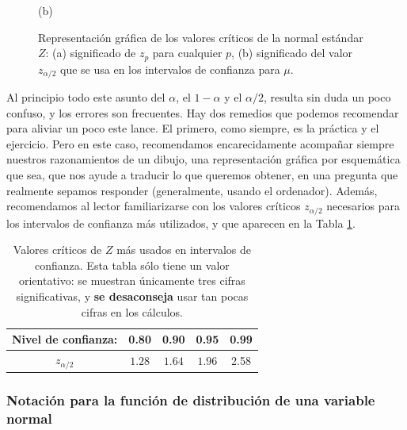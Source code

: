 \begin{figure}[h!]
\begin{center}
\begin{bn}
(b)
\end{bn}
\caption{Representación gráfica de los valores críticos de la normal estándar $Z$:
(a) significado de $z_p$ para cualquier $p$, (b) significado del valor $z_{\alpha/2}$ que se
usa en los intervalos de confianza para $\mu$.}
\label{cap06:fig:ValorCriticoZ}
\end{center}
\end{figure}
%

Al principio todo este asunto del $\alpha$, el $1-\alpha$ y el $\alpha/2$,
resulta sin duda un poco confuso, y los errores son frecuentes. Hay dos
remedios que podemos recomendar para aliviar un poco este lance. El primero,
como siempre, es la práctica y el ejercicio. Pero en este caso, recomendamos
encarecidamente acompañar siempre nuestros razonamientos de un dibujo, una
representación gráfica por esquemática que sea, que nos ayude a traducir lo que
queremos obtener, en una pregunta que realmente sepamos responder
(generalmente, usando el ordenador). Además, recomendamos al lector
familiarizarse con los valores críticos $z_{\alpha/2}$ necesarios para los
intervalos de confianza más utilizados, y que aparecen en la Tabla
\ref{cap06:tabla:valoresCriticosZ}.
\begin{table}[h!]
\begin{center}
\begin{tabular}{|c|c|c|c|c|}
\hline
{\bf Nivel de confianza:}\rule{0cm}{0.5cm}&0.80&0.90&0.95&0.99\\
\hline
$z_{\alpha/2}$\rule{0cm}{0.5cm}&$1.28$&$1.64$&$1.96$&2.58\\[3mm]
\hline
\end{tabular}
\end{center}
\label{cap06:tabla:valoresCriticosZ}
\caption{Valores críticos de $Z$ más usados en intervalos de confianza. Esta tabla sólo tiene un valor orientativo: se muestran únicamente tres cifras significativas, y {\bf se desaconseja} usar tan pocas cifras en los cálculos.}
\end{table}

\subsubsection{Notación para la función de distribución de una variable normal}
\label{ch06:subsubsec:NotacionPhiFuncionDistribucionZ}

